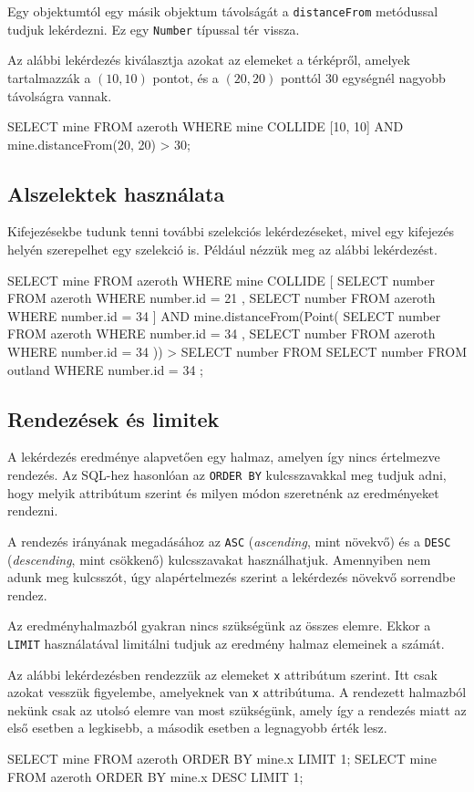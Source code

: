 Egy objektumtól egy másik objektum távolságát a \texttt{distanceFrom} metódussal tudjuk lekérdezni. Ez egy \texttt{Number} típussal tér vissza.

Az alábbi lekérdezés kiválasztja azokat az elemeket a térképről, amelyek tartalmazzák a $(10, 10)$ pontot, és a $(20, 20)$ ponttól 30 egységnél nagyobb távolságra vannak.
\begin{sql}
SELECT mine
FROM azeroth
WHERE mine COLLIDE [10, 10] AND mine.distanceFrom(20, 20) > 30;
\end{sql}

\subsection{Alszelektek használata}

Kifejezésekbe tudunk tenni további szelekciós lekérdezéseket, mivel egy kifejezés helyén szerepelhet egy szelekció is. Például nézzük meg az alábbi lekérdezést.
\begin{sql}
SELECT mine FROM azeroth
WHERE mine COLLIDE [
    { SELECT number FROM azeroth WHERE number.id = 21 },
    { SELECT number FROM azeroth WHERE number.id = 34 }
] AND
mine.distanceFrom(Point(
    { SELECT number FROM azeroth WHERE number.id = 34 },
    { SELECT number FROM azeroth WHERE number.id = 34 }))
    >
    { SELECT number FROM { SELECT number FROM outland }
      WHERE number.id = 34
    };
\end{sql}

\subsection{Rendezések és limitek}

A lekérdezés eredménye alapvetően egy halmaz, amelyen így nincs értelmezve rendezés. Az SQL-hez hasonlóan az \texttt{ORDER BY} kulcsszavakkal meg tudjuk adni, hogy melyik attribútum szerint és milyen módon szeretnénk az eredményeket rendezni.

A rendezés irányának megadásához az \texttt{ASC} (\textit{ascending}, mint növekvő) és a \texttt{DESC} (\textit{descending}, mint csökkenő) kulcsszavakat használhatjuk. Amennyiben nem adunk meg kulcsszót, úgy alapértelmezés szerint a lekérdezés növekvő sorrendbe rendez.

Az eredményhalmazból gyakran nincs szükségünk az összes elemre. Ekkor a \texttt{LIMIT} használatával limitálni tudjuk az eredmény halmaz elemeinek a számát.

Az alábbi lekérdezésben rendezzük az elemeket \texttt{x} attribútum szerint. Itt csak azokat vesszük figyelembe, amelyeknek van \texttt{x} attribútuma. A rendezett halmazból nekünk csak az utolsó elemre van most szükségünk, amely így a rendezés miatt az első esetben a legkisebb, a második esetben a legnagyobb érték lesz.
\begin{sql}
SELECT mine FROM azeroth ORDER BY mine.x LIMIT 1;
SELECT mine FROM azeroth ORDER BY mine.x DESC LIMIT 1;
\end{sql}

